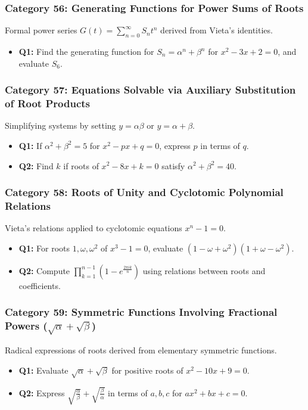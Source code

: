 \documentclass[10pt,a4paper]{article}
\begin{document}
\subsubsection{Category 56: Generating Functions for Power Sums of Roots}
Formal power series $G(t) = \sum_{n=0}^{\infty} S_n t^n$ derived from Vieta's identities.
\begin{itemize}[leftmargin=*]
    \item \textbf{Q1:} Find the generating function for $S_n = \alpha^n + \beta^n$ for $x^2 - 3x + 2 = 0$, and evaluate $S_6$.
\end{itemize}

\subsubsection{Category 57: Equations Solvable via Auxiliary Substitution of Root Products}
Simplifying systems by setting $y = \alpha\beta$ or $y = \alpha + \beta$.
\begin{itemize}[leftmargin=*]
    \item \textbf{Q1:} If $\alpha^2 + \beta^2 = 5$ for $x^2 - px + q = 0$, express $p$ in terms of $q$.
    \item \textbf{Q2:} Find $k$ if roots of $x^2 - 8x + k = 0$ satisfy $\alpha^2 + \beta^2 = 40$.
\end{itemize}

\subsubsection{Category 58: Roots of Unity and Cyclotomic Polynomial Relations}
Vieta's relations applied to cyclotomic equations $x^n - 1 = 0$.
\begin{itemize}[leftmargin=*]
    \item \textbf{Q1:} For roots $1, \omega, \omega^2$ of $x^3 - 1 = 0$, evaluate $(1 - \omega + \omega^2)(1 + \omega - \omega^2)$.
    \item \textbf{Q2:} Compute $\prod_{k=1}^{n-1} (1 - e^{\frac{2\pi i k}{n}})$ using relations between roots and coefficients.
\end{itemize}

\subsubsection{Category 59: Symmetric Functions Involving Fractional Powers ($\sqrt{\alpha} + \sqrt{\beta}$)}
Radical expressions of roots derived from elementary symmetric functions.
\begin{itemize}[leftmargin=*]
    \item \textbf{Q1:} Evaluate $\sqrt{\alpha} + \sqrt{\beta}$ for positive roots of $x^2 - 10x + 9 = 0$.
    \item \textbf{Q2:} Express $\sqrt{\frac{\alpha}{\beta}} + \sqrt{\frac{\beta}{\alpha}}$ in terms of $a,b,c$ for $ax^2 + bx + c = 0$.
\end{itemize}
\end{document}
